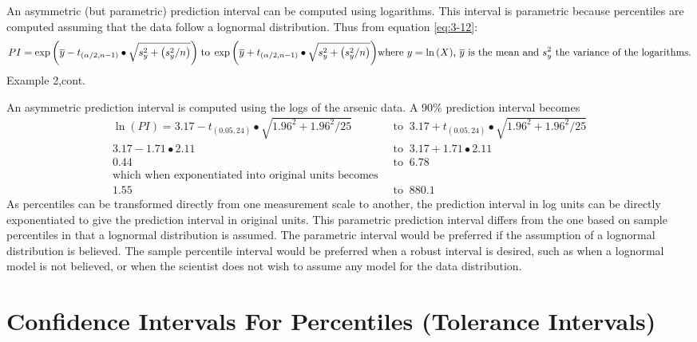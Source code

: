 \documentclass[]{book}
\begin{document}
An asymmetric (but parametric) prediction interval can be computed using logarithms. This interval is parametric because percentiles are computed assuming that the data follow a lognormal distribution. Thus from equation \eqref{eq:3-12}:
\begin{equation}
PI = \exp{\left( \overline{y} - t_{(\alpha / 2, n - 1)} \bullet \sqrt{s^{2}_{y} + \left( s^{2}_{y} / n \right)}\right)} \text{$\;$to$\;$} \exp{\left( \overline{y} + t_{(\alpha / 2, n - 1)} \bullet \sqrt{s^{2}_{y} + \left( s^{2}_{y} / n \right)}\right)} \\
\text{where $y = \ln{(X)}$, $\overline{y}$ is the mean and $s^{2}_{y}$ the variance of the logarithms.}
\label{eq:3-13}
\end{equation}
Example 2,cont.

An asymmetric prediction interval is computed using the logs of the arsenic data. A 90\% prediction interval becomes
\begin{equation}
\begin{aligned}
\ln{(PI)} = 3.17 - t_{(0.05, 24)} \bullet \sqrt{1.96^{2} + 1.96^{2} / 25} &\text{$\;\;$to$\;\;$} 3.17 + t_{(0.05, 24)} \bullet \sqrt{1.96^{2} + 1.96^{2} / 25} \\
3.17 - 1.71 \bullet 2.11 &\text{$\;\;$to$\;\;$} 3.17 + 1.71 \bullet 2.11 \\
0.44 &\text{$\;\;$to$\;\;$} 6.78 \\
\text{which when exponentiated into original units becomes} \\
1.55 &\text{$\;\;$to$\;\;$} 880.1
\end{aligned}
\end{equation}
As percentiles can be transformed directly from one measurement scale to another, the prediction interval in log units can be directly exponentiated to give the prediction interval in original units. This parametric prediction interval differs from the one based on sample percentiles in that a lognormal distribution is assumed. The parametric interval would be preferred if the assumption of a lognormal distribution is believed. The sample percentile interval would be preferred when a robust interval is desired, such as when a lognormal model is not believed, or when the scientist does not wish to assume any model for the data distribution.

\hypertarget{ch3-7}{%
\section{Confidence Intervals For Percentiles (Tolerance Intervals)}\label{ch3-7}}
\end{document}
